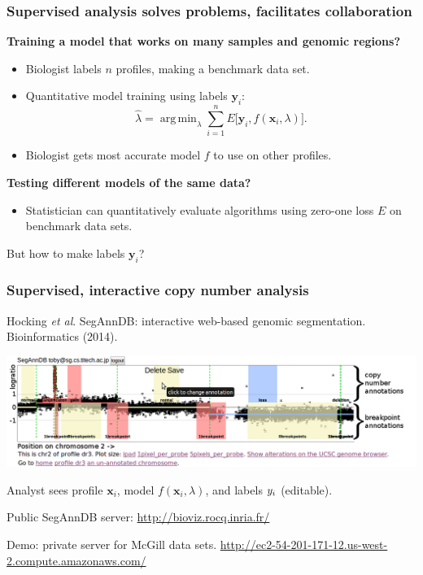 \documentclass{beamer}
\DeclareMathOperator*{\argmin}{arg\,min}
\begin{document}
\begin{frame}
  \frametitle{Supervised analysis solves problems, facilitates
    collaboration}
  \textbf{Training a model that works on many samples and genomic
    regions?} 
  \begin{itemize}
  \item Biologist labels $n$ profiles, making a benchmark data set.
  \item Quantitative model training using labels $\mathbf y_i$:
  \begin{equation*}
    \hat \lambda = \argmin_{\lambda}
    \sum_{i=1}^n
    E\big[
      \mathbf y_i,
      f(\mathbf x_i, \lambda)
    \big].
  \end{equation*}
  \item Biologist gets most accurate model $f$ to use on other profiles.
  \end{itemize}
  \textbf{Testing different models of the same data?} 
  \begin{itemize}
  \item Statistician can quantitatively evaluate algorithms using
    zero-one loss $E$ on benchmark data sets.
  \end{itemize}
  But how to make labels $\mathbf y_i$?
\end{frame}

\begin{frame}
  \frametitle{Supervised, interactive copy number analysis}

  Hocking \textit{et al}. SegAnnDB: interactive web-based genomic
  segmentation. Bioinformatics (2014).
  \begin{center}
\includegraphics[width=\textwidth]{new-new-annotations}
  \end{center}
  Analyst sees profile $\mathbf x_i$, model $f(\mathbf x_i, \lambda)$,
  and labels $\mathbf \mathbf y_i$ (editable).

  \vskip 0.1in Public SegAnnDB
  server: \url{http://bioviz.rocq.inria.fr/}

\vskip 0.1in
Demo: private server for McGill data sets.
\small
\url{http://ec2-54-201-171-12.us-west-2.compute.amazonaws.com/}

\end{frame}
\end{document}
